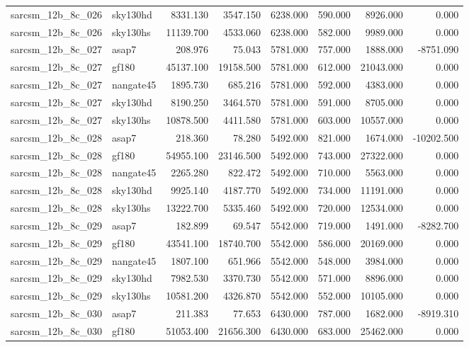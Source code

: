 \begin{tabular}{llrrrrrr}
sarcsm\_12b\_8c\_026 & sky130hd & 8331.130 & 3547.150 & 6238.000 & 590.000 & 8926.000 & 0.000 \\
sarcsm\_12b\_8c\_026 & sky130hs & 11139.700 & 4533.060 & 6238.000 & 582.000 & 9989.000 & 0.000 \\
sarcsm\_12b\_8c\_027 & asap7 & 208.976 & 75.043 & 5781.000 & 757.000 & 1888.000 & -8751.090 \\
sarcsm\_12b\_8c\_027 & gf180 & 45137.100 & 19158.500 & 5781.000 & 612.000 & 21043.000 & 0.000 \\
sarcsm\_12b\_8c\_027 & nangate45 & 1895.730 & 685.216 & 5781.000 & 592.000 & 4383.000 & 0.000 \\
sarcsm\_12b\_8c\_027 & sky130hd & 8190.250 & 3464.570 & 5781.000 & 591.000 & 8705.000 & 0.000 \\
sarcsm\_12b\_8c\_027 & sky130hs & 10878.500 & 4411.580 & 5781.000 & 603.000 & 10557.000 & 0.000 \\
sarcsm\_12b\_8c\_028 & asap7 & 218.360 & 78.280 & 5492.000 & 821.000 & 1674.000 & -10202.500 \\
sarcsm\_12b\_8c\_028 & gf180 & 54955.100 & 23146.500 & 5492.000 & 743.000 & 27322.000 & 0.000 \\
sarcsm\_12b\_8c\_028 & nangate45 & 2265.280 & 822.472 & 5492.000 & 710.000 & 5563.000 & 0.000 \\
sarcsm\_12b\_8c\_028 & sky130hd & 9925.140 & 4187.770 & 5492.000 & 734.000 & 11191.000 & 0.000 \\
sarcsm\_12b\_8c\_028 & sky130hs & 13222.700 & 5335.460 & 5492.000 & 720.000 & 12534.000 & 0.000 \\
sarcsm\_12b\_8c\_029 & asap7 & 182.899 & 69.547 & 5542.000 & 719.000 & 1491.000 & -8282.700 \\
sarcsm\_12b\_8c\_029 & gf180 & 43541.100 & 18740.700 & 5542.000 & 586.000 & 20169.000 & 0.000 \\
sarcsm\_12b\_8c\_029 & nangate45 & 1807.100 & 651.966 & 5542.000 & 548.000 & 3984.000 & 0.000 \\
sarcsm\_12b\_8c\_029 & sky130hd & 7982.530 & 3370.730 & 5542.000 & 571.000 & 8896.000 & 0.000 \\
sarcsm\_12b\_8c\_029 & sky130hs & 10581.200 & 4326.870 & 5542.000 & 552.000 & 10105.000 & 0.000 \\
sarcsm\_12b\_8c\_030 & asap7 & 211.383 & 77.653 & 6430.000 & 787.000 & 1682.000 & -8919.310 \\
sarcsm\_12b\_8c\_030 & gf180 & 51053.400 & 21656.300 & 6430.000 & 683.000 & 25462.000 & 0.000 \\

\end{tabular}
